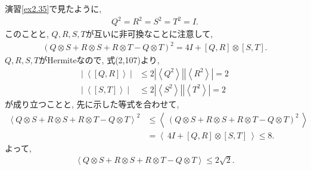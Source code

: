 \begin{problem}
\label{problem2.3}
演習\ref{ex2.35}で見たように,
\begin{align*}
    Q^2 = R^2 = S^2 = T^2 = I.
\end{align*}
このことと, $Q,R,S,T$が互いに非可換なことに注意して,
\begin{align*}
    \left(
    Q \otimes S + R \otimes S + R \otimes T - Q \otimes T
    \right)^2
    =
    4I + [Q,R] \otimes [S,T].
\end{align*}
$Q,R,S,T$がHermiteなので, 式(2,107)より,
\begin{align*}
    \left| \ \left< [Q,R]\right> \ \right|
     & \leq 2 \left| \left< Q^2 \right> \right| \left| \left< R^2\right> \right|  = 2 \\
    \left| \ \left< [S,T]\right> \ \right|
     & \leq 2 \left| \left< S^2 \right> \right| \left| \left< T^2\right> \right|  = 2
\end{align*}
が成り立つことと, 先に示した等式を合わせて,
\begin{align*}
    \left<
    Q \otimes S + R \otimes S + R \otimes T - Q \otimes T
    \right>^2
     & \leq
    \left<\
    \left(
    Q \otimes S + R \otimes S + R \otimes T - Q \otimes T
    \right)^2\
    \right>
    \\
     &
    =
    \left<\
    4I + [Q,R] \otimes [S,T]
    \
    \right>
    \leq 8.
\end{align*}
よって,
\begin{align*}
    \left<
    Q \otimes S + R \otimes S + R \otimes T - Q \otimes T
    \right>
    \leq 2 \sqrt{2}.
\end{align*}
\end{problem}